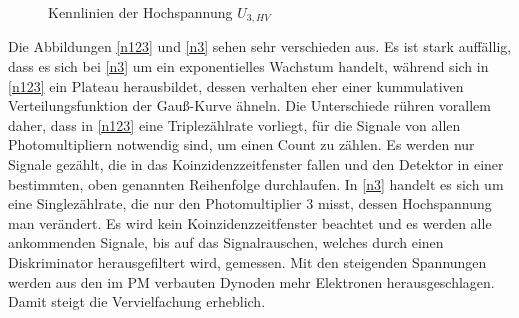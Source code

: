             \begin{figure}[htbp]
                \caption{Kennlinien der Hochspannung $U_{3,HV}$}
            \end{figure}
            Die Abbildungen \ref{n123} und \ref{n3} sehen sehr verschieden aus. Es ist stark auffällig, dass es sich bei \ref{n3} um ein exponentielles Wachstum handelt, während sich in \ref{n123} ein Plateau herausbildet, dessen verhalten eher einer kummulativen Verteilungsfunktion der Gauß-Kurve ähneln. 
            Die Unterschiede rühren vorallem daher, dass in \ref{n123} eine Triplezählrate vorliegt, für die Signale von allen Photomultipliern notwendig sind, um einen Count zu zählen. Es werden nur Signale gezählt, die in das Koinzidenzzeitfenster fallen und den Detektor in einer bestimmten, oben genannten Reihenfolge durchlaufen. In \ref{n3} handelt es sich um eine Singlezählrate, die nur den Photomultiplier 3 misst, dessen Hochspannung man verändert. Es wird kein Koinzidenzzeitfenster beachtet und es werden alle ankommenden Signale, bis auf das Signalrauschen, welches durch einen Diskriminator herausgefiltert wird, gemessen. Mit den steigenden Spannungen werden aus den im PM verbauten Dynoden mehr Elektronen herausgeschlagen. Damit steigt die Vervielfachung erheblich.\\
